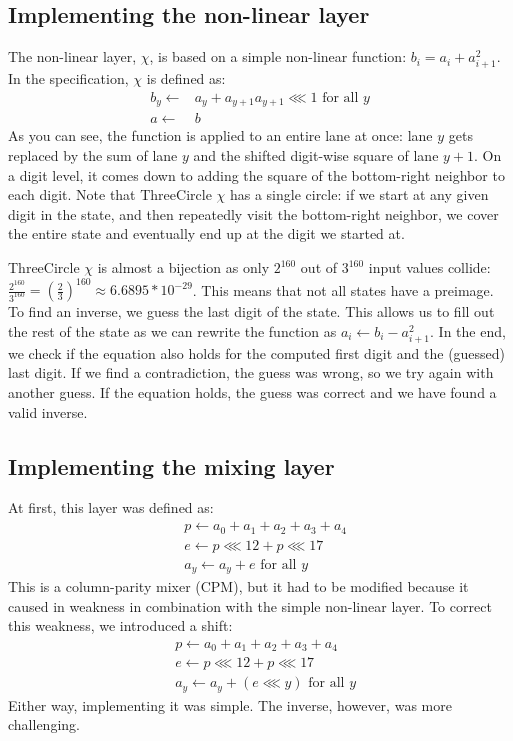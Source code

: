 \documentclass{report}
\newcommand{\ThreeCircle}{{\sc ThreeCircle} }
\begin{document}
\subsection{Implementing the non-linear layer}
The non-linear layer, $\chi$, is based on a simple non-linear function: $b_i = a_i + a_{i+1}^2$.
In the specification, $\chi$ is defined as:
\begin{equation*}
\begin{split}
b_y \leftarrow& a_y + a_{y+1}a_{y+1} \lll 1 \text{ for all } y\\
a \leftarrow& b
\end{split}
\end{equation*}
As you can see, the function is applied to an entire lane at once: lane $y$ gets replaced by the sum of lane $y$ and the shifted digit-wise square of lane $y+1$. On a digit level, it comes down to adding the square of the bottom-right neighbor to each digit. Note that \ThreeCircle $\chi$ has a single circle: if we start at any given digit in the state, and then repeatedly visit the bottom-right neighbor, we cover the entire state and eventually end up at the digit we started at.

\ThreeCircle $\chi$ is almost a bijection as only $2^{160}$ out of $3^{160}$ input values collide: $\frac{2^{160}}{3^{160}} = (\frac{2}{3})^{160} \approx 6.6895*10^{-29}$. This means that not all states have a preimage. To find an inverse, we guess the last digit of the state. This allows us to fill out the rest of the state as we can rewrite the function as $a_i \leftarrow b_i - a_{i+1}^2$.
In the end, we check if the equation also holds for the computed first digit and the (guessed) last digit. If we find a contradiction, the guess was wrong, so we try again with another guess. If the equation holds, the guess was correct and we have found a valid inverse.

\subsection{Implementing the mixing layer}
At first, this layer was defined as:
\begin{equation}
\begin{split}
&p \leftarrow a_0 + a_1 + a_2 + a_3 + a_4 \\
&e \leftarrow p \lll 12 + p \lll 17 \\
&a_y \leftarrow a_y + e \text{ for all } y
\end{split}
\tag{$\theta$}
\end{equation}
This is a column-parity mixer (CPM), but it had to be modified because it caused in weakness in combination with the simple non-linear layer. To correct this weakness, we introduced a shift:
\begin{equation}
\begin{split}
&p \leftarrow a_0 + a_1 + a_2 + a_3 + a_4 \\
&e \leftarrow p \lll 12 + p \lll 17 \\
&a_y \leftarrow a_y + (e \lll y) \text{ for all } y
\end{split}
\tag{$\theta$}
\end{equation}
Either way, implementing it was simple. The inverse, however, was more challenging.
\end{document}
